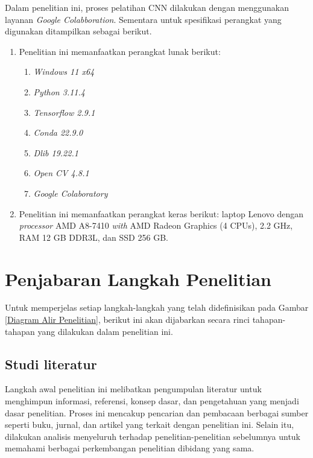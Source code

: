 Dalam penelitian ini, proses pelatihan CNN dilakukan dengan menggunakan layanan \textit{Google Colabboration}. 
Sementara untuk spesifikasi perangkat yang digunakan ditampilkan sebagai berikut.


    \begin{enumerate}
        \item Penelitian ini memanfaatkan perangkat lunak berikut:

        \begin{enumerate}
            \item \textit{Windows 11 x64}
            \item \textit{Python 3.11.4}
            \item \textit{Tensorflow 2.9.1}
            \item \textit{Conda 22.9.0} \item \textit {Dlib 19.22.1}
            \item \textit{Open CV 4.8.1}
            \item \textit{Google Colaboratory}
        \end{enumerate}
        
        \item Penelitian ini memanfaatkan perangkat keras berikut: laptop Lenovo dengan \textit{processor} AMD  A8-7410 \textit{with} AMD Radeon Graphics (4 CPUs),  2.2 GHz, RAM 12 GB DDR3L, dan SSD 256 GB.

    \end{enumerate}
    
\section{Penjabaran Langkah Penelitian}

    Untuk memperjelas setiap langkah-langkah yang telah didefinisikan pada Gambar \ref{Diagram Alir Penelitian}, berikut ini akan dijabarkan secara rinci tahapan-tahapan yang dilakukan dalam penelitian ini.
    
\subsection{Studi literatur}

    Langkah awal penelitian ini melibatkan pengumpulan literatur untuk menghimpun informasi, referensi, konsep dasar, dan pengetahuan yang menjadi dasar penelitian. Proses ini mencakup pencarian dan pembacaan berbagai sumber seperti buku, jurnal, dan artikel yang terkait dengan penelitian ini. Selain itu, dilakukan analisis menyeluruh terhadap penelitian-penelitian sebelumnya untuk memahami berbagai perkembangan penelitian dibidang yang sama.


